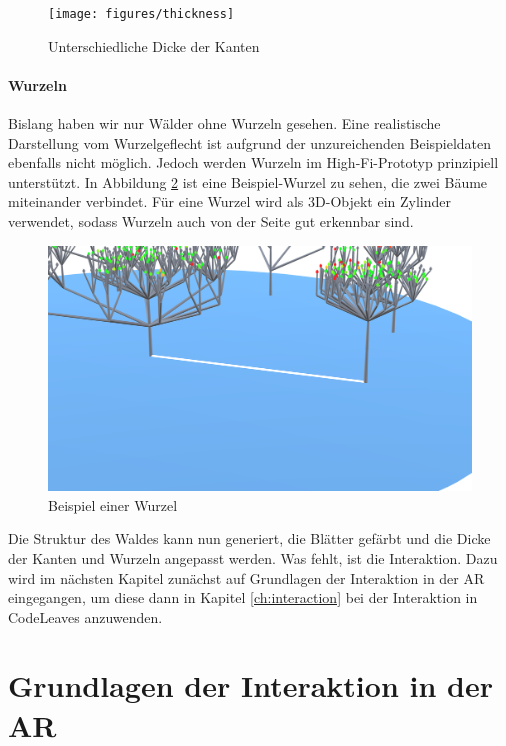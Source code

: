 \begin{figure}[htb]
  \texttt{[image: figures/thickness]}
  \caption{Unterschiedliche Dicke der Kanten}
  \label{fig:thickness}
\end{figure}

\subsubsection*{Wurzeln}

Bislang haben wir nur Wälder ohne Wurzeln gesehen. Eine realistische Darstellung vom Wurzelgeflecht ist aufgrund der unzureichenden Beispieldaten ebenfalls nicht möglich. Jedoch werden Wurzeln im High-Fi-Prototyp prinzipiell  unterstützt. In Abbildung \ref{fig:root} ist eine Beispiel-Wurzel zu sehen, die zwei Bäume miteinander verbindet. Für eine Wurzel wird als 3D-Objekt ein Zylinder verwendet, sodass Wurzeln auch von der Seite gut erkennbar sind.

\begin{figure}[htb]
  \includegraphics[width=\textwidth]{figures/root}
  \caption{Beispiel einer Wurzel}
  \label{fig:root}
\end{figure}

Die Struktur des Waldes kann nun generiert, die Blätter gefärbt und die Dicke der Kanten und Wurzeln angepasst werden. Was fehlt, ist die Interaktion. Dazu wird im nächsten Kapitel zunächst auf Grundlagen der Interaktion in der AR eingegangen, um diese dann in Kapitel \ref{ch:interaction} bei der Interaktion in CodeLeaves anzuwenden.

\chapter{Grundlagen der Interaktion in der AR}
\label{ch:interaction-ar}

